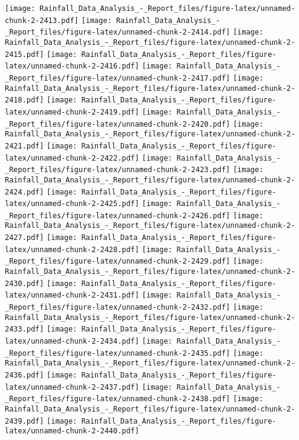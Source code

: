 \documentclass[
]{article}
\begin{document}
\texttt{[image: Rainfall\_Data\_Analysis\_-\_Report\_files/figure-latex/unnamed-chunk-2-2413.pdf]}
\texttt{[image: Rainfall\_Data\_Analysis\_-\_Report\_files/figure-latex/unnamed-chunk-2-2414.pdf]}
\texttt{[image: Rainfall\_Data\_Analysis\_-\_Report\_files/figure-latex/unnamed-chunk-2-2415.pdf]}
\texttt{[image: Rainfall\_Data\_Analysis\_-\_Report\_files/figure-latex/unnamed-chunk-2-2416.pdf]}
\texttt{[image: Rainfall\_Data\_Analysis\_-\_Report\_files/figure-latex/unnamed-chunk-2-2417.pdf]}
\texttt{[image: Rainfall\_Data\_Analysis\_-\_Report\_files/figure-latex/unnamed-chunk-2-2418.pdf]}
\texttt{[image: Rainfall\_Data\_Analysis\_-\_Report\_files/figure-latex/unnamed-chunk-2-2419.pdf]}
\texttt{[image: Rainfall\_Data\_Analysis\_-\_Report\_files/figure-latex/unnamed-chunk-2-2420.pdf]}
\texttt{[image: Rainfall\_Data\_Analysis\_-\_Report\_files/figure-latex/unnamed-chunk-2-2421.pdf]}
\texttt{[image: Rainfall\_Data\_Analysis\_-\_Report\_files/figure-latex/unnamed-chunk-2-2422.pdf]}
\texttt{[image: Rainfall\_Data\_Analysis\_-\_Report\_files/figure-latex/unnamed-chunk-2-2423.pdf]}
\texttt{[image: Rainfall\_Data\_Analysis\_-\_Report\_files/figure-latex/unnamed-chunk-2-2424.pdf]}
\texttt{[image: Rainfall\_Data\_Analysis\_-\_Report\_files/figure-latex/unnamed-chunk-2-2425.pdf]}
\texttt{[image: Rainfall\_Data\_Analysis\_-\_Report\_files/figure-latex/unnamed-chunk-2-2426.pdf]}
\texttt{[image: Rainfall\_Data\_Analysis\_-\_Report\_files/figure-latex/unnamed-chunk-2-2427.pdf]}
\texttt{[image: Rainfall\_Data\_Analysis\_-\_Report\_files/figure-latex/unnamed-chunk-2-2428.pdf]}
\texttt{[image: Rainfall\_Data\_Analysis\_-\_Report\_files/figure-latex/unnamed-chunk-2-2429.pdf]}
\texttt{[image: Rainfall\_Data\_Analysis\_-\_Report\_files/figure-latex/unnamed-chunk-2-2430.pdf]}
\texttt{[image: Rainfall\_Data\_Analysis\_-\_Report\_files/figure-latex/unnamed-chunk-2-2431.pdf]}
\texttt{[image: Rainfall\_Data\_Analysis\_-\_Report\_files/figure-latex/unnamed-chunk-2-2432.pdf]}
\texttt{[image: Rainfall\_Data\_Analysis\_-\_Report\_files/figure-latex/unnamed-chunk-2-2433.pdf]}
\texttt{[image: Rainfall\_Data\_Analysis\_-\_Report\_files/figure-latex/unnamed-chunk-2-2434.pdf]}
\texttt{[image: Rainfall\_Data\_Analysis\_-\_Report\_files/figure-latex/unnamed-chunk-2-2435.pdf]}
\texttt{[image: Rainfall\_Data\_Analysis\_-\_Report\_files/figure-latex/unnamed-chunk-2-2436.pdf]}
\texttt{[image: Rainfall\_Data\_Analysis\_-\_Report\_files/figure-latex/unnamed-chunk-2-2437.pdf]}
\texttt{[image: Rainfall\_Data\_Analysis\_-\_Report\_files/figure-latex/unnamed-chunk-2-2438.pdf]}
\texttt{[image: Rainfall\_Data\_Analysis\_-\_Report\_files/figure-latex/unnamed-chunk-2-2439.pdf]}
\texttt{[image: Rainfall\_Data\_Analysis\_-\_Report\_files/figure-latex/unnamed-chunk-2-2440.pdf]}
\end{document}
